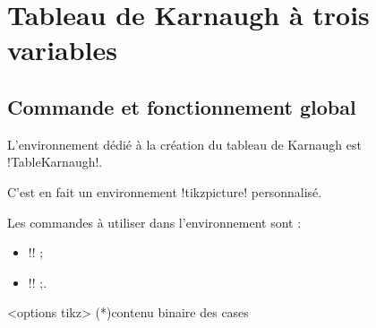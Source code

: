 \documentclass[french,a4paper,11pt]{article}
\begin{document}
{\pagebreak

\section{Tableau de Karnaugh à trois variables}

\subsection{Commande et fonctionnement global}

\begin{cautionblock}
L'environnement dédié à la création du tableau de Karnaugh est \motcletex!TableKarnaugh!.

C'est en fait un environnement \motcletex!tikzpicture! personnalisé.

\smallskip

Les commandes à utiliser dans l'environnement sont :

\begin{itemize}
	\item \motcletex!\KarnaughCasesResult! ;
	\item \motcletex!\KarnaughBlocRegroup! ;.
\end{itemize}
\vspace*{-\baselineskip}\leavevmode
\end{cautionblock}

\begin{DemoCode}
\begin{TableKarnaugh}[clés]<options tikz>
	\KarnaughCasesResult(*){contenu binaire des cases}
\end{TableKarnaugh}
\end{DemoCode}
%

\begin{DemoCode}[]
\begin{TableKarnaugh}[Aide]
\end{TableKarnaugh}
\hspace{0.5cm}
\begin{TableKarnaugh}[Variables=u/v/w]
\end{TableKarnaugh}
\hspace{0.5cm}
\begin{TableKarnaugh}[Variables=u/v/w,Swap]
\end{TableKarnaugh}


\end{DemoCode}}
\end{document}
